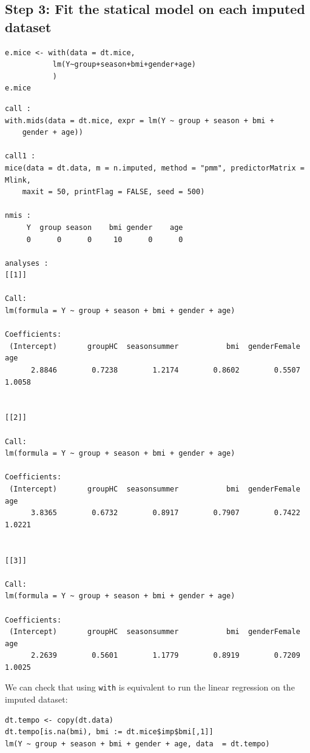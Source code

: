 \documentclass[12pt]{article}
\begin{document}
\clearpage

\subsection{Step 3: Fit the statical model on each imputed dataset}
\label{sec:org8dfbc79}

\lstset{language=r,label= ,caption= ,captionpos=b,numbers=none}
\begin{lstlisting}
e.mice <- with(data = dt.mice,
	       lm(Y~group+season+bmi+gender+age)
	       )
e.mice
\end{lstlisting}

\begin{verbatim}
call :
with.mids(data = dt.mice, expr = lm(Y ~ group + season + bmi + 
    gender + age))

call1 :
mice(data = dt.data, m = n.imputed, method = "pmm", predictorMatrix = Mlink, 
    maxit = 50, printFlag = FALSE, seed = 500)

nmis :
     Y  group season    bmi gender    age 
     0      0      0     10      0      0 

analyses :
[[1]]

Call:
lm(formula = Y ~ group + season + bmi + gender + age)

Coefficients:
 (Intercept)       groupHC  seasonsummer           bmi  genderFemale           age  
      2.8846        0.7238        1.2174        0.8602        0.5507        1.0058  


[[2]]

Call:
lm(formula = Y ~ group + season + bmi + gender + age)

Coefficients:
 (Intercept)       groupHC  seasonsummer           bmi  genderFemale           age  
      3.8365        0.6732        0.8917        0.7907        0.7422        1.0221  


[[3]]

Call:
lm(formula = Y ~ group + season + bmi + gender + age)

Coefficients:
 (Intercept)       groupHC  seasonsummer           bmi  genderFemale           age  
      2.2639        0.5601        1.1779        0.8919        0.7209        1.0025
\end{verbatim}

We can check that using \texttt{with} is equivalent to run the linear
regression on the imputed dataset:
\lstset{language=r,label= ,caption= ,captionpos=b,numbers=none}
\begin{lstlisting}
dt.tempo <- copy(dt.data)
dt.tempo[is.na(bmi), bmi := dt.mice$imp$bmi[,1]]
lm(Y ~ group + season + bmi + gender + age, data  = dt.tempo)
\end{lstlisting}
\end{document}

